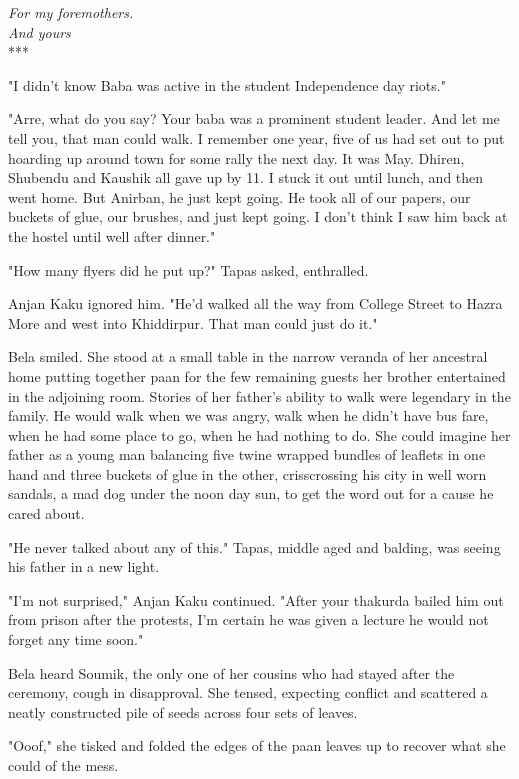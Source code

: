 \documentclass{amsart}
\begin{document}
\begin{center} \emph{For my foremothers. \\  And yours}  \\ *** \end{center}
	
"I didn't know Baba was active in the student Independence day riots."

"Arre, what do you say? Your baba was a prominent student leader. And let me tell you, that man could walk. I remember one year, five of us had set out to put hoarding up around town for some rally the next day. It was May. Dhiren, Shubendu and Kaushik all gave up by 11. I stuck it out until lunch, and then went home. But Anirban, he just kept going. He took all of our papers, our buckets of glue, our brushes, and just kept going. I don't think I saw him back at the hostel until well after dinner."

"How many flyers did he put up?" Tapas asked, enthralled.

Anjan Kaku ignored him. "He'd walked all the way from College Street to Hazra More and west into Khiddirpur. That man could just do it."

Bela smiled. She stood at a small table in the narrow veranda of her ancestral home putting together paan for the few remaining guests her brother entertained in the adjoining room. Stories of her father's ability to walk were legendary in the family. He would walk when we was angry, walk when he didn't have bus fare, when he had some place to go, when he had nothing to do. She could imagine her father as a young man balancing five twine wrapped bundles of leaflets in one hand and three buckets of glue in the other, crisscrossing his city in well worn sandals, a mad dog under the noon day sun, to get the word out for a cause he cared about.

"He never talked about any of this." Tapas, middle aged and balding, was seeing his father in a new light.

"I'm not surprised," Anjan Kaku continued. "After your thakurda bailed him out from prison after the protests, I'm certain he was given a lecture he would not forget any time soon." 

Bela heard Soumik, the only one of her cousins who had stayed after the ceremony, cough in disapproval. She tensed, expecting conflict and scattered a neatly constructed pile of seeds across four sets of leaves.

"Ooof," she tisked and folded the edges of the paan leaves up to recover what she could of the mess.
\end{document}

